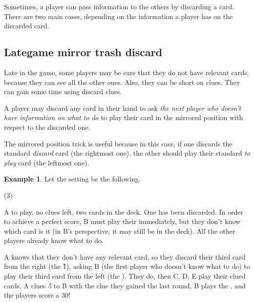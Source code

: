 \documentclass[a4paper]{article}
\theoremstyle{plain}
\theoremstyle{definition}
\newtheorem{example}[theorem]{Example}
\begin{document}
Sometimes, a player can pass information to the others by discarding a card. There are two main cases, depending on the information a player has on the discarded card.

%
%

\subsection{Lategame mirror trash discard}

Late in the game, some players may be sure that they do not have relevant cards, because they can see all the other ones. Also, they can be short on clues. They can gain some time using discard clues.

A player may discard any card in their hand to ask \textit{the next player who doesn't have information on what to do} to play their card in the mirrored position with respect to the discarded one.

The mirrored position trick is useful because in this case, if one discards the standard \textit{discard} card (the rightmost one), the other should play their standard \textit{to play} card (the leftmost one).

\begin{example}
	
	Let the setting be the following.
	
	\begin{tasks}(3)
		\task[+]      
		\task[A]    
		\task[B]    
		\task[C]    
		\task[D]    
		\task[E]    
	\end{tasks}
	
	A to play, no clues left, two cards in the deck. One  has been discarded. In order to achieve a perfect score, B must play their  immediately, but they don't know which card is it (in B's perspective, it may still be in the deck). All the other players already know what to do.
	
	A knows that they don't have any relevant card, so they discard their third card from the right (the \G{1}), asking B (the first player who doesn't know what to do) to play their third card from the left (the ). They do, then C, D, E play their clued cards, A clues \textit{5} to B with the clue they gained the last round, B plays the , and the players score a 30!
\end{example}
\end{document}
